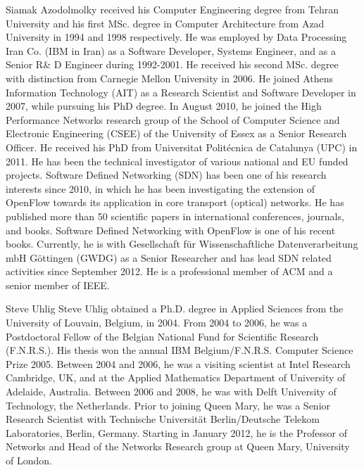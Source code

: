 \documentclass[journal]{IEEEtran}
\begin{document}
\begin{IEEEbiographynophoto}{Siamak Azodolmolky}
received his Computer Engineering degree from Tehran University and his first MSc. degree in Computer Architecture from Azad University in 1994 and 1998 respectively. He was employed by Data Processing Iran Co. (IBM in Iran) as a Software Developer, Systems Engineer, and as a Senior R\& D Engineer during 1992-2001. He received his second MSc. degree with distinction from Carnegie Mellon University in 2006. He joined Athens Information Technology (AIT) as a Research Scientist and Software Developer in 2007, while pursuing his PhD degree. In August 2010, he joined the High Performance Networks research group of the School of Computer Science and Electronic Engineering (CSEE) of the University of Essex as a Senior Research Officer. He received his PhD from Universitat Polit\'{e}cnica de Catalunya (UPC) in 2011. He has been the technical investigator of various national and EU funded projects. Software Defined Networking (SDN) has been one of his research interests since 2010, in which he has been investigating the extension of OpenFlow towards its application in core transport (optical) networks. He has published more than 50 scientific papers in international conferences, journals, and books. Software Defined Networking with OpenFlow is one of his recent books. Currently, he is with Gesellschaft f\"{u}r Wissenschaftliche Datenverarbeitung mbH G\"{o}ttingen (GWDG) as a Senior Researcher and has lead SDN related activities since September 2012. He is a professional member of ACM and a senior member of IEEE.
\end{IEEEbiographynophoto}

\begin{IEEEbiographynophoto}{Steve Uhlig}
Steve Uhlig obtained a Ph.D. degree in Applied Sciences from the University of Louvain, Belgium, in 2004. From 2004 to 2006, he was a Postdoctoral Fellow of the Belgian National Fund for Scientific Research (F.N.R.S.). His thesis won the annual IBM Belgium/F.N.R.S. Computer Science Prize 2005. Between 2004 and 2006, he was a visiting scientist at Intel Research Cambridge, UK, and at the Applied Mathematics Department of University of Adelaide, Australia. Between 2006 and 2008, he was with Delft University of Technology, the Netherlands. Prior to joining Queen Mary, he was a Senior Research Scientist with Technische Universit\"{a}t Berlin/Deutsche Telekom Laboratories, Berlin, Germany. Starting in January 2012, he is the Professor of Networks and Head of the Networks Research group at Queen Mary, University of London.
\end{IEEEbiographynophoto}





\end{document}
